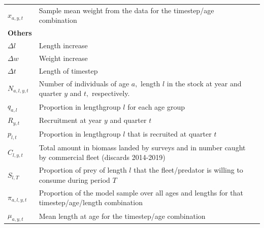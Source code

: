 \documentclass[review]{elsarticle}
\begin{document}
\begin{table}[h]
\begin{tabular}{|l|l l|}
$x_{a,y,t}$  &  Sample mean weight from the data for the timestep/age combination  \\

\textbf{Others}   &  \\

$\Delta l $ &   Length increase \\

$\Delta w$  &   Weight increase \\

$\Delta t$ & Length of timestep \\
$N_{a,l,y,t}$    &     Number of individuals of age $a,$ length $l$  in the stock at year and quarter $y$ and $t,$ respectively.  \\

$q_{a,l}$ & Proportion in lengthgroup $l$ for each age group \\



$R_{y,t}$ & Recruitment at year $y$ and quarter $t$ \\

$p_{l,t}$ & Proportion in lengthgroup $l$ that is recruited at quarter $t$ \\

$C_{l,y,t}$ & Total amount in biomass landed by surveys and in number caught by commercial fleet (discards 2014-2019)    \\

$S_{l,T}$  &    Proportion of prey of length $l$ that the fleet/predator is willing to consume during period $T$  \\


$\pi_{a,l,y,t}$ & Proportion of the model sample  over all ages and lengths for that timestep/age/length combination \\

$\mu_{a,y,t}$  & Mean length at age  for the timestep/age combination \\



\end{tabular}
\end{table}
\end{document}

